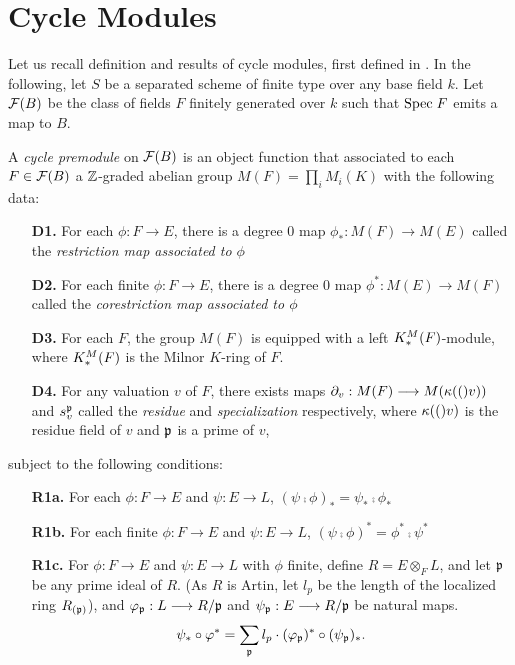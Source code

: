 \section{Cycle Modules}

Let us recall definition and results of cycle modules, first
defined in \cite{Ro96}. In the following, let $S$ be a separated 
scheme of finite type over any base field $k$. Let $\mathcal{F}(B)$ 
be the class of fields $F$ finitely generated over $k$ such that
$\mathrm{Spec}\; F$ emits a map to $B$.

\begin{definition}
A \emph{cycle premodule} on $\mathcal{F}(B)$ is an object function
that associated to each $F \in \mathcal{F}(B)$ a $\mathbb{Z}$-graded abelian
group $M(F) = \prod_i M_i(K)$ with the following data:

\begin{enumerate}
\item[\textbf{D1.}] For each $\phi: F \to E$, there is a degree 0
map $\phi_*: M(F) \to M(E)$ called the \emph{restriction map 
associated to $\phi$}

\item[\textbf{D2.}] For each finite $\phi: F \to E$, there is a 
degree 0 map $\phi^*: M(E) \to M(F)$ called the \emph{corestriction
map associated to $\phi$}

\item[\textbf{D3.}] For each $F$, the group $M(F)$ is equipped
with a left $K^M_*(F)$-module, where $K^M_*(F)$ is the Milnor
$K$-ring of $F$.

\item[\textbf{D4.}] For any valuation $v$ of $F$, there exists 
maps $\partial_{v}: M(F) \longrightarrow M(\kappa(()v))$ and $s_{v}^{\mathfrak{p}}$
called the \emph{residue} and \emph{specialization} respectively, 
where $\kappa(()v)$ is the residue field of $v$ and $\mathfrak{p}$ is 
a prime of $v$,
\end{enumerate}

subject to the following conditions:

\begin{enumerate}
\item[\textbf{R1a.}] For each $\phi: F \to E$ and $\psi: E \to L$,
$(\psi \comp \phi)_* = \psi_* \comp \phi_*$

\item[\textbf{R1b.}] For each finite $\phi: F \to E$ and $\psi: E
\to L$, $(\psi \comp \phi)^* = \phi^* \comp \psi^*$

\item[\textbf{R1c.}] For $\phi: F \to E$ and $\psi: E \to L$ with
$\phi$ finite, define $R = E \otimes_F L$, and let $\mathfrak{p}$
be any prime ideal of $R$. (As $R$ is Artin, let $l_p$ be the 
length of the localized ring $R_{(\mathfrak{p})}$), and 
$\varphi_{\mathfrak{p}}: L \longrightarrow R/{\mathfrak{p}}$ and 
$\psi_{\mathfrak{p}}: E \longrightarrow R/{\mathfrak{p}}$ be natural maps.
\[
\psi_*\circ \varphi^* = \sum_{\mathfrak{p}} l_p \cdot 
(\varphi_{\mathfrak{p}})^* \circ (\psi_{\mathfrak{p}})_*.
\]


\end{enumerate}
\end{definition}
